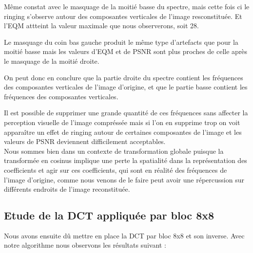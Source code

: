 \documentclass[12pt]{report}
\begin{document}
Même constat avec le  masquage de la moitié basse du spectre, mais cette fois ci le ringing s'observe autour des composantes verticales de l'image resconstituée. Et l'EQM attteint la valeur maximale que nous observerons, soit 28. 

Le masquage du coin bas gauche produit le même type d'artefacts que pour la moitié basse mais les valeurs d'EQM et de PSNR sont plus proches de celle après le masquage de la moitié droite.

On peut donc en conclure que la partie droite du spectre contient les fréquences des composantes verticales de l'image d'origine, et que le partie basse contient les fréquences des composantes verticales.

Il est possible de supprimer une grande quantité de ces fréquences sans affecter la perception visuelle de l'image compréssée mais si l'on en supprime trop on voit apparaître un effet de ringing autour de certaines composantes de l'image et les valeurs de PSNR deviennent difficilement acceptables.\\

Nous sommes bien dans un contexte de transformation globale puisque la transformée en cosinus implique une perte la spatialité dans la représentation des coefficients et agir sur ces coefficients, qui sont en réalité des fréquences de l'image d'origine, comme nous venons de le faire peut avoir une répercussion sur différents endroits de l'image reconstituée.

\subsection{Etude de la DCT appliquée par bloc 8x8}
Nous avons ensuite dû mettre en place la DCT par bloc 8x8 et son inverse. Avec notre algorithme nous observons les résultats suivant :
\end{document}

